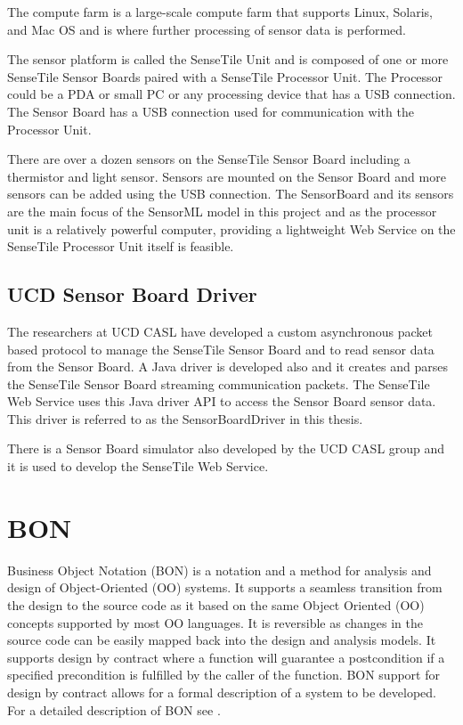 \documentclass[]{final_report}
\begin{document}
The compute farm is a large-scale compute farm that supports Linux, Solaris, and Mac OS and is where further processing of sensor data is performed.

The sensor platform is called the SenseTile Unit and is composed of one or more SenseTile Sensor Boards paired with a SenseTile Processor Unit. The Processor could be a PDA or small PC or any processing device that has a USB connection.  The Sensor Board has a USB connection used for communication with the Processor Unit. 

There are over a dozen sensors on the SenseTile Sensor Board including a thermistor and light sensor. Sensors are mounted on the Sensor Board and more sensors can be added using the USB connection. The SensorBoard and its sensors are the main focus of the SensorML model in this project and as the processor unit is a relatively powerful computer, providing a lightweight Web Service on the SenseTile Processor Unit itself is feasible.

\subsection{UCD Sensor Board Driver}\label{SensorBoardDriverSec}

The researchers at UCD CASL have developed a custom asynchronous packet based protocol to manage the SenseTile Sensor Board and to read sensor data from the Sensor Board.  A Java driver is developed also and it creates and parses the SenseTile Sensor Board streaming communication packets. The SenseTile Web Service uses this Java driver API to access the Sensor Board sensor data. This driver is referred to as the SensorBoardDriver in this thesis.

There is a Sensor Board simulator also developed by the UCD CASL group and it is used to develop the SenseTile Web Service.


\section{BON} \label{BONsec}
Business Object Notation (BON) is a notation and a method for analysis and design of Object-Oriented (OO) systems. It supports a seamless transition from the design to the source code as it based on the same Object Oriented (OO) concepts supported by most OO languages. It is reversible as changes in the source code can be easily mapped back into the design and analysis models. It supports design by contract\cite{Meyerref} where a function will guarantee a postcondition if a specified precondition is fulfilled by the caller of the function. BON support for design by contract allows for a formal description of a system to be developed. For a detailed description of BON see \cite{BONref}.
\end{document}
